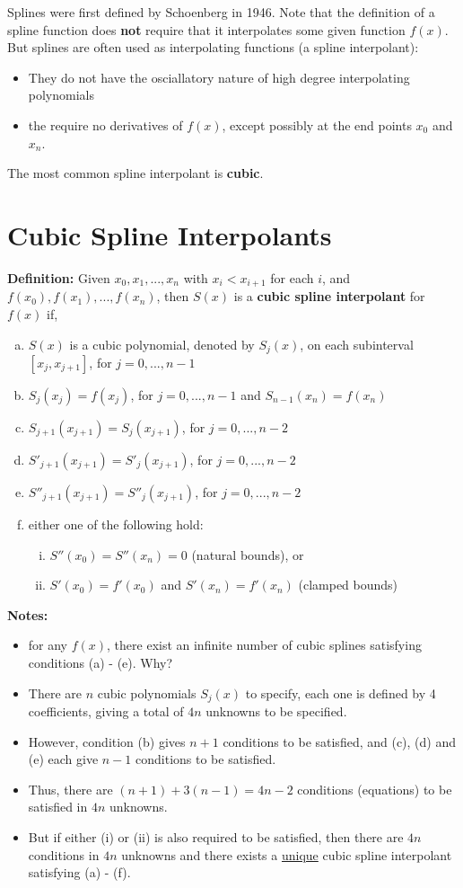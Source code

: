 \documentclass [titlepage,12pt,letter] {article}
\begin{document}
Splines were first defined by Schoenberg in 1946. Note that the definition of a spline function does {\bf not} require that it interpolates some given function $f(x)$. But splines are often used as interpolating functions (a spline interpolant): 
\begin{itemize} 
\item They do not have the osciallatory nature of high degree interpolating polynomials 
\item the require no derivatives of $f(x)$, except possibly at the end points $x_0$ and $x_n$. 
\end{itemize} 

The most common spline interpolant is {\bf cubic}. 

\section{Cubic Spline Interpolants}


{\bf Definition:} Given $x_0,x_1,...,x_n$ with $x_i < x_{i+1}$ for each $i$, and $f(x_0), f(x_1), ..., f(x_n)$, then $S(x)$ is a {\bf cubic spline interpolant} for $f(x)$ if,

\begin{enumerate}[(a)]
\item{$S(x)$ is a cubic polynomial, denoted by $S_j(x)$, on each subinterval $[x_j,x_{j+1}]$, for $j=0,...,n-1$}
\item{$S_j(x_j)=f(x_j)$, for $j=0,...,n-1$ and $S_{n-1}(x_n)=f(x_n)$}
\item{$S_{j+1}(x_{j+1})=S_j(x_{j+1})$, for $j=0,...,n-2$}
\item{$S'_{j+1}(x_{j+1})=S'_j(x_{j+1})$, for $j=0,...,n-2$}
\item{$S''_{j+1}(x_{j+1})=S''_j(x_{j+1})$, for $j=0,...,n-2$}
\item{either one of the following hold:}
\begin{enumerate}[(i)]
\item{$S''(x_0)=S''(x_n)=0$ (natural bounds), or}
\item{$S'(x_0)=f'(x_0)$ and $S'(x_n)=f'(x_n)$ (clamped bounds)}
\end{enumerate}
\end{enumerate}


{\bf Notes:}
\begin{itemize}
\item{for any $f(x)$, there exist an infinite number of cubic splines satisfying conditions (a) - (e). Why?}
\item{There are $n$ cubic polynomials $S_j(x)$ to specify, each one is defined by 4 coefficients, giving a total of $4n$ unknowns to be specified.}
\item{However, condition (b) gives $n+1$ conditions to be satisfied, and (c), (d) and (e) each give $n-1$ conditions to be satisfied.}
\item{Thus, there are $(n+1)+3(n-1)=4n-2$ conditions (equations) to be satisfied in $4n$ unknowns.}
\item{But if either (i) or (ii) is also required to be satisfied, then there are $4n$ conditions in $4n$ unknowns and there exists a \underline{unique} cubic spline interpolant satisfying (a) - (f).}
\end{itemize}
\end{document}
